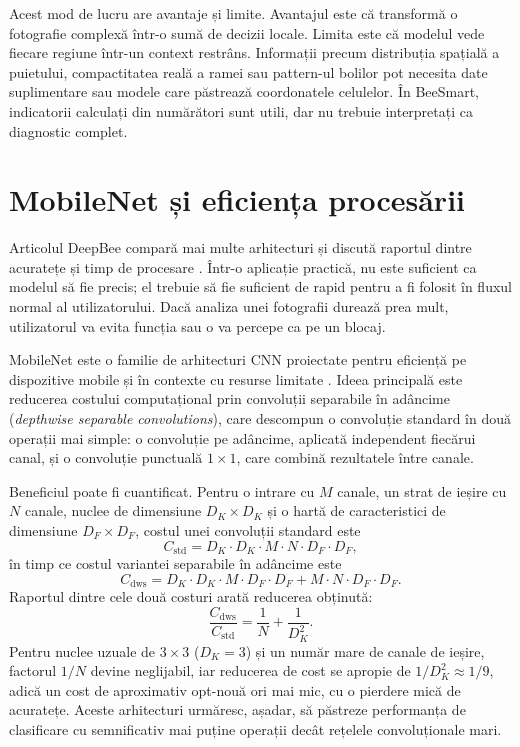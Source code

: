 Acest mod de lucru are avantaje și limite. Avantajul este că transformă o fotografie complexă într-o sumă de decizii locale. Limita este că modelul vede fiecare regiune într-un context restrâns. Informații precum distribuția spațială a puietului, compactitatea reală a ramei sau pattern-ul bolilor pot necesita date suplimentare sau modele care păstrează coordonatele celulelor. În BeeSmart, indicatorii calculați din numărători sunt utili, dar nu trebuie interpretați ca diagnostic complet.

\section{MobileNet și eficiența procesării}

Articolul DeepBee compară mai multe arhitecturi și discută raportul dintre acuratețe și timp de procesare \cite{deepbeeArticle}. Într-o aplicație practică, nu este suficient ca modelul să fie precis; el trebuie să fie suficient de rapid pentru a fi folosit în fluxul normal al utilizatorului. Dacă analiza unei fotografii durează prea mult, utilizatorul va evita funcția sau o va percepe ca pe un blocaj.

MobileNet este o familie de arhitecturi CNN proiectate pentru eficiență pe dispozitive mobile și în contexte cu resurse limitate \cite{mobilenetHoward2017}. Ideea principală este reducerea costului computațional prin convoluții separabile în adâncime (\emph{depthwise separable convolutions}), care descompun o convoluție standard în două operații mai simple: o convoluție pe adâncime, aplicată independent fiecărui canal, și o convoluție punctuală $1 \times 1$, care combină rezultatele între canale.

Beneficiul poate fi cuantificat. Pentru o intrare cu $M$ canale, un strat de ieșire cu $N$ canale, nuclee de dimensiune $D_K \times D_K$ și o hartă de caracteristici de dimensiune $D_F \times D_F$, costul unei convoluții standard este
\begin{equation}
	C_{\text{std}} = D_K \cdot D_K \cdot M \cdot N \cdot D_F \cdot D_F,
	\label{eq:cost-std}
\end{equation}
în timp ce costul variantei separabile în adâncime este
\begin{equation}
	C_{\text{dws}} = D_K \cdot D_K \cdot M \cdot D_F \cdot D_F + M \cdot N \cdot D_F \cdot D_F.
	\label{eq:cost-dws}
\end{equation}
Raportul dintre cele două costuri arată reducerea obținută:
\begin{equation}
	\frac{C_{\text{dws}}}{C_{\text{std}}} = \frac{1}{N} + \frac{1}{D_K^2}.
	\label{eq:cost-ratio}
\end{equation}
Pentru nuclee uzuale de $3 \times 3$ ($D_K = 3$) și un număr mare de canale de ieșire, factorul $1/N$ devine neglijabil, iar reducerea de cost se apropie de $1/D_K^2 \approx 1/9$, adică un cost de aproximativ opt-nouă ori mai mic, cu o pierdere mică de acuratețe. Aceste arhitecturi urmăresc, așadar, să păstreze performanța de clasificare cu semnificativ mai puține operații decât rețelele convoluționale mari.


